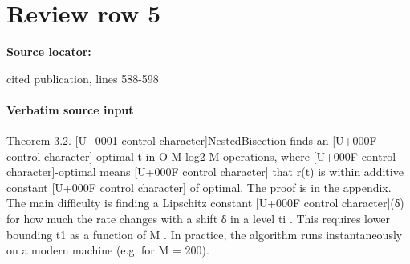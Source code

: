 \documentclass[10pt]{article}
\begin{document}
\section*{Review row 5}
\textbf{Source locator:} {\footnotesize\raggedright cited publication, lines 588-\allowbreak{}598\par}
\paragraph{Verbatim source input}
\begin{ReviewVerbatim}
Theorem 3.2. [U+0001 control character]NestedBisection finds an [U+000F control character]-optimal t
in O M log2 M
operations, where [U+000F control character]-optimal means
[U+000F control character]
that r(t) is within additive constant [U+000F control character] of optimal.
The proof is in the appendix. The main difficulty
is finding a Lipschitz constant [U+000F control character](δ) for how much
the rate changes with a shift δ in a level ti . This
requires lower bounding t1 as a function of M . In
practice, the algorithm runs instantaneously on a
modern machine (e.g. for M = 200).
\end{ReviewVerbatim}
\end{document}
